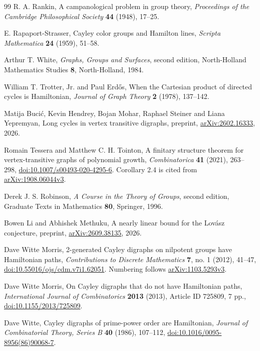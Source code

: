 \documentclass[11pt,a4paper,reqno]{amsart}
\theoremstyle{definition}
\theoremstyle{remark}
\numberwithin{equation}{section}
\begin{document}
\begin{thebibliography}{99}
R. A. Rankin, A campanological problem in group theory, \emph{Proceedings of the Cambridge Philosophical Society} \textbf{44} (1948), 17--25.

E. Rapaport-Strasser, Cayley color groups and Hamilton lines, \emph{Scripta Mathematica} \textbf{24} (1959), 51--58.

Arthur T. White, \emph{Graphs, Groups and Surfaces}, second edition, North-Holland Mathematics Studies \textbf{8}, North-Holland, 1984.

William T. Trotter, Jr. and Paul Erd\H{o}s, When the Cartesian product of directed cycles is Hamiltonian, \emph{Journal of Graph Theory} \textbf{2} (1978), 137--142.

Matija Buci\'c, Kevin Hendrey, Bojan Mohar, Raphael Steiner and Liana Yepremyan, Long cycles in vertex transitive digraphs, preprint, \href{https://arxiv.org/abs/2602.16333}{arXiv:2602.16333}, 2026.

Romain Tessera and Matthew C. H. Tointon, A finitary structure theorem for vertex-transitive graphs of polynomial growth, \emph{Combinatorica} \textbf{41} (2021), 263--298, \href{https://doi.org/10.1007/s00493-020-4295-6}{doi:10.1007/s00493-020-4295-6}. Corollary 2.4 is cited from \href{https://arxiv.org/abs/1908.06044v3}{arXiv:1908.06044v3}.

Derek J. S. Robinson, \emph{A Course in the Theory of Groups}, second edition, Graduate Texts in Mathematics \textbf{80}, Springer, 1996.

Bowen Li and Abhishek Methuku, A nearly linear bound for the Lov\'asz conjecture, preprint, \href{https://arxiv.org/abs/2609.38135}{arXiv:2609.38135}, 2026.

Dave Witte Morris, 2-generated Cayley digraphs on nilpotent groups have Hamiltonian paths, \emph{Contributions to Discrete Mathematics} \textbf{7}, no. 1 (2012), 41--47, \href{https://doi.org/10.55016/ojs/cdm.v7i1.62051}{doi:10.55016/ojs/cdm.v7i1.62051}. Numbering follows \href{https://arxiv.org/abs/1103.5293v3}{arXiv:1103.5293v3}.

Dave Witte Morris, On Cayley digraphs that do not have Hamiltonian paths, \emph{International Journal of Combinatorics} \textbf{2013} (2013), Article ID 725809, 7 pp., \href{https://doi.org/10.1155/2013/725809}{doi:10.1155/2013/725809}.

Dave Witte, Cayley digraphs of prime-power order are Hamiltonian, \emph{Journal of Combinatorial Theory, Series B} \textbf{40} (1986), 107--112, \href{https://doi.org/10.1016/0095-8956(86)90068-7}{doi:10.1016/0095-8956(86)90068-7}.


\end{thebibliography}
\end{document}
